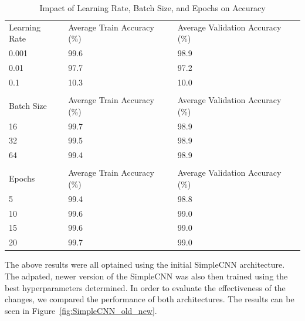 \begin{table}[ht]
  \caption{Impact of Learning Rate, Batch Size, and Epochs on Accuracy}\label{table:lr_bs_ep}
  \centering
  \begin{tabular}{lll}
  \toprule
  \addlinespace
  \multicolumn{3}{c}{Learning Rate} \\
  \midrule
  Learning Rate & Average Train Accuracy (\%) & Average Validation Accuracy (\%) \\
  \midrule
  0.001 & 99.6 & 98.9 \\
  0.01  & 97.7 & 97.2 \\
  0.1   & 10.3 & 10.0 \\
  \midrule
  \addlinespace
  \addlinespace
  \multicolumn{3}{c}{Batch Size} \\
  \midrule
  Batch Size & Average Train Accuracy (\%) & Average Validation Accuracy (\%) \\
  \midrule
  16 & 99.7 & 98.9 \\
  32 & 99.5 & 98.9 \\
  64 & 99.4 & 98.9 \\
  \midrule
  \addlinespace
  \addlinespace
  \multicolumn{3}{c}{Epochs} \\
  \midrule
  Epochs & Average Train Accuracy (\%) & Average Validation Accuracy (\%) \\
  \midrule
  5  & 99.4 & 98.8 \\
  10 & 99.6 & 99.0 \\
  15 & 99.6 & 99.0 \\
  20 & 99.7 & 99.0 \\
  \bottomrule
  \end{tabular}
  \end{table}
  

The above results were all optained using the initial SimpleCNN architecture. The adpated, newer version of the SimpleCNN was also then trained using the best hyperparameters determined. In order to evaluate the effectiveness of the changes, we compared the performance of both architectures. The results can be seen in Figure~\ref{fig:SimpleCNN_old_new}.

